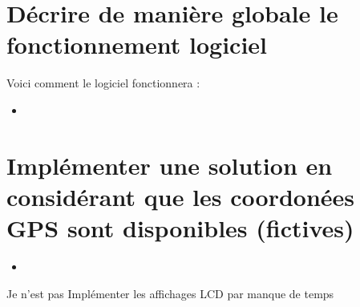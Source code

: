 \documentclass[10pt,a4paper]{article}
\newcommand{\insertcode}[2]{\begin{itemize}\item[]\end{itemize}}
\begin{document}
\section{Décrire de manière globale le fonctionnement logiciel}
 Voici comment le logiciel fonctionnera :
 
 \insertcode{code/pseudocode}{pseudocode}
 \section{ Implémenter une solution en considérant que les coordonées GPS sont disponibles (fictives)}
 \insertcode{code/code.ino}{code}
 Je n'est pas Implémenter les affichages LCD par manque de temps
 
 
 
 
 
\end{document}

